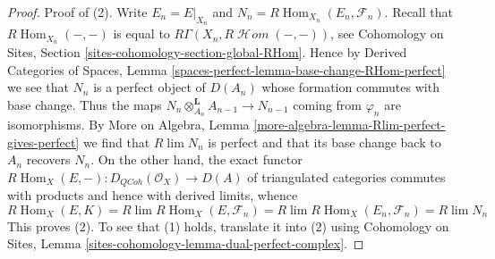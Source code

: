 \documentclass[10pt,a4paper]{amsart}
\theoremstyle{plain}
\theoremstyle{definition}
\theoremstyle{remark}
\numberwithin{equation}{subsection}
\def\lim{\mathop{\mathrm{lim}}\nolimits}
\def\Hom{\mathop{\mathrm{Hom}}\nolimits}
\def\SheafHom{\mathop{\mathcal{H}\!\mathit{om}}\nolimits}
\def\QCoh{\mathit{QCoh}}
\begin{document}
\begin{proof}
Proof of (2). Write $E_n = E|_{X_n}$ and
$N_n = R\Hom_{X_n}(E_n, \mathcal{F}_n)$.
Recall that $R\Hom_{X_n}(-, -)$ is equal to
$R\Gamma(X_n, R\SheafHom(-, -))$, see
Cohomology on Sites, Section \ref{sites-cohomology-section-global-RHom}.
Hence by Derived Categories of Spaces, Lemma
\ref{spaces-perfect-lemma-base-change-RHom-perfect}
we see that $N_n$ is a perfect object of $D(A_n)$
whose formation commutes with base change. Thus the maps
$N_n \otimes_{A_n}^\mathbf{L} A_{n - 1} \to N_{n - 1}$
coming from $\varphi_n$ are isomorphisms.
By More on Algebra, Lemma \ref{more-algebra-lemma-Rlim-perfect-gives-perfect}
we find that $R\lim N_n$ is perfect and
that its base change back to $A_n$ recovers $N_n$.
On the other hand, the exact functor
$R\Hom_X(E, -) : D_\QCoh(\mathcal{O}_X) \to D(A)$
of triangulated categories commutes with products
and hence with derived limits, whence
$$
R\Hom_X(E, K) =
R\lim R\Hom_X(E, \mathcal{F}_n) =
R\lim R\Hom_X(E_n, \mathcal{F}_n) =
R\lim N_n
$$
This proves (2). To see that (1) holds, translate it into (2)
using Cohomology on Sites, Lemma
\ref{sites-cohomology-lemma-dual-perfect-complex}.
\end{proof}
\end{document}
